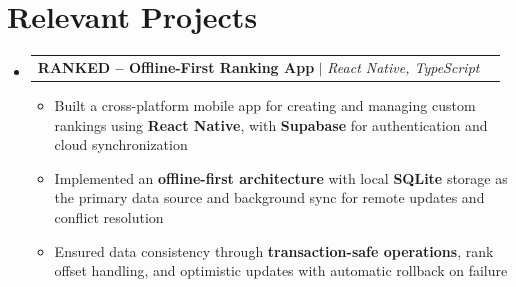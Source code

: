 \documentclass[letterpaper,11pt]{article}
\makeatletter
\newcommand{\resumeItem}[1]{
  \item\small{
    {#1 \vspace{-2pt}}
  }
}
\newcommand{\resumeProjectHeading}[2]{
    \item
    \begin{tabular*}{0.97\textwidth}{l@{\extracolsep{\fill}}r}
      \small#1 & #2 \\
    \end{tabular*}\vspace{-7pt}
}
\newcommand{\resumeSubHeadingListStart}{\begin{itemize}[leftmargin=0.15in, label={}]}
\newcommand{\resumeSubHeadingListEnd}{\end{itemize}}
\newcommand{\resumeItemListStart}{\begin{itemize}}
\newcommand{\resumeItemListEnd}{\end{itemize}\vspace{-5pt}}
\makeatother
\begin{document}


\section{Relevant Projects}
    \resumeSubHeadingListStart
        \resumeProjectHeading
        {\textbf{RANKED – Offline-First Ranking App} $|$ \emph{React Native, TypeScript}}{}
        \resumeItemListStart
                \resumeItem{Built a cross-platform mobile app for creating and managing custom rankings using \textbf{React Native}, with \textbf{Supabase} for authentication and cloud synchronization}
                \resumeItem{Implemented an \textbf{offline-first architecture} with local \textbf{SQLite} storage as the primary data source and background sync for remote updates and conflict resolution}
                \resumeItem{Ensured data consistency through \textbf{transaction-safe operations}, rank offset handling, and optimistic updates with automatic rollback on failure}
        
        \resumeItemListEnd
        
    \resumeSubHeadingListEnd
\end{document}
